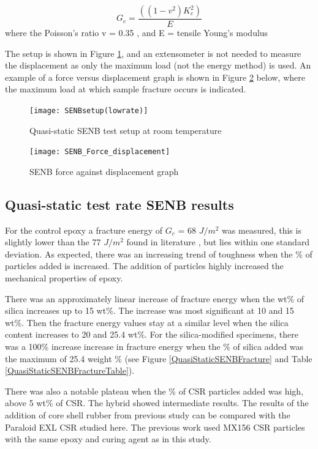 \documentclass[numbers=noendperiod,chapterprefix=on]{icldt} %
\begin{document}
\begin{equation} 
G_c= \frac{((1-v^2) K_c^2)}{E}
\end{equation}
where the Poisson's ratio v = 0.35 \cite{Karac2011}, and E = tensile Young's modulus

The setup is shown in Figure \ref{SENBsetup}, and an extensometer is not needed to measure the displacement as only the maximum load (not the energy method) is used. An example of a force versus displacement graph is shown in Figure \ref{SENB_Force_displacement} below, where the maximum load at which sample fracture occurs is indicated.

\begin{figure}[!hp]
\centering
\texttt{[image: SENBsetup(lowrate)]}
\caption{Quasi-static SENB test setup at room temperature} \label{SENBsetup}
\end{figure}
\FloatBarrier


\begin{figure}[!hp]
\centering
\texttt{[image: SENB\_Force\_displacement]}
\caption{SENB force against displacement graph} \label{SENB_Force_displacement}
\end{figure}
\FloatBarrier

\subsection{Quasi-static test rate SENB results} \label{SENB_results}

For the control epoxy a fracture energy of $G_c $ = 68 $J/m^2$ was measured, this is slightly lower than the 77 $J/m^2$ found in literature \cite{Giannakopoulos2011}, but lies within one standard deviation.
As expected, there was an increasing trend of toughness when the \% of particles added is increased. The addition of particles highly increased the mechanical properties of epoxy. 

There was an approximately linear increase of fracture energy when the wt\% of silica increases up to 15 wt\%. The increase was most significant at 10 and 15 wt\%. Then the fracture energy values stay at a similar level when the silica content increases to 20 and 25.4 wt\%.
For the silica-modified specimens, there was a 100\% increase increase in fracture energy when the \% of silica added was the maximum of 25.4 weight \% (see Figure \ref{QuasiStaticSENBFracture} and Table \ref{QuasiStaticSENBFractureTable}).

There was also a notable plateau when the \% of CSR particles added was high, above 5 wt\% of CSR. The hybrid showed intermediate results. 
The results of the addition of core shell rubber from previous study can be compared with the Paraloid EXL CSR studied here. The previous work used MX156 CSR particles with the same epoxy and curing agent as in this study.
\end{document}

